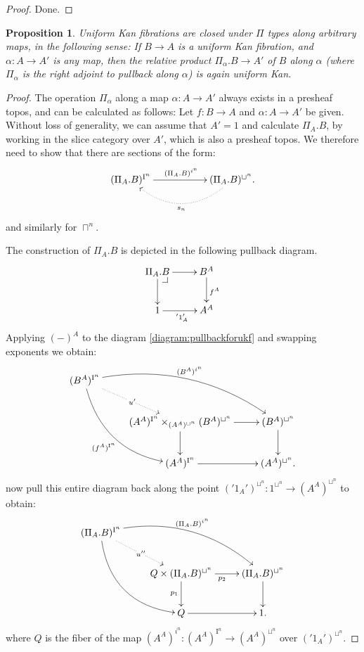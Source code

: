 \documentclass[11pt]{article}
\makeatletter
\newcommand{\pbcorner}[1][dr]{\save*!/#1-1.2pc/#1:(-1,1)@^{|-}\restore}
\newcommand{\I}{\ensuremath{\mathrm{I}}}
\newtheorem{proposition}[theorem]{Proposition}
\theoremstyle{remark}
\theoremstyle{definition}
\makeatother
\begin{document}
\begin{proof}
Done.
\end{proof}

\begin{proposition}
Uniform Kan fibrations are closed under $\Pi$ types along arbitrary maps, in the following sense:
If $B\to A$ is a uniform Kan fibration, and $\alpha: A\to A'$ is any map, then the relative product $\Pi_\alpha.B\to A'$ of $B$ along $\alpha$ (where $\Pi_\alpha$ is the right adjoint to pullback along $\alpha$) is again uniform Kan.
\end{proposition}

\begin{proof}
The operation $\Pi_\alpha$ along a map $\alpha : A\to A'$ always exists in a presheaf topos, and can  be calculated as follows:  Let $f:B\to A$ and $\alpha: A\to A'$ be given.  Without loss of generality, we can assume that $A' =1$ and calculate $\Pi_A.B$, by working in the slice category over $A'$, which is also a presheaf topos.  We therefore need to show that there are sections of the form:
\[
\xymatrix{
(\Pi_A.B)^{\I^n} \ar[rr]^{(\Pi_A.B)^{i^n}} & & \ar@{.>}@/{}^{2pc}/[ll]^{s_n} (\Pi_A.B)^{\sqcup^n}.
}
\]
and similarly for $\sqcap^n$.

The construction of $\Pi_A.B$ is depicted in the following pullback diagram.
\begin{equation}%
\xymatrix{
\Pi_A.B \ar[d] \ar[r] \pbcorner & B^A \ar[d]^{f^A} \\
1 \ar[r]_{^\prime1_A^\prime} & A^A
}
\end{equation}
Applying $(-)^A$ to the diagram \eqref{diagram:pullbackforukf} and swapping exponents we obtain:
\begin{equation}\label{diagram:pullbackforukf2}
\xymatrix{
(B^A)^{\I^n} \ar@/{}_{2pc}/[rdd]_{(f^A)^{\I^n}} \ar@/{}^{2pc}/[rrd]^{(B^A)^{i^n}} \ar@{.>}[rd]|{u'} & & \\
&  (A^A)^{\I^n}\times_{(A^A)^{\sqcup^n}} (B^A)^{\sqcup^n} \ar[d] \ar[r] & (B^A)^{\sqcup^n} \ar[d] \\
& (A^A)^{\I^n} \ar[r] & (A^A)^{\sqcup^n}.
}
\end{equation}
now pull this entire diagram back along the point $('1_A')^{\sqcup^n}
: 1^{\sqcup^n} \to (A^A)^{\sqcup^n}$ to obtain:
\begin{equation}\label{diagram:pullbackforukf3}
\xymatrix{
(\Pi_A.B )^{\I^n} \ar@/{}_{2pc}/[rdd] \ar@/{}^{2pc}/[rrd]^{(\Pi_A.B )^{i^n}} \ar@{.>}[rd]|{u''} & & \\
&  Q \times (\Pi_A.B )^{\sqcup^n} \ar[d]_{p_1} \ar[r]_{p_2} & (\Pi_A.B )^{\sqcup^n} \ar[d] \\
& Q \ar[r] & 1.
}
\end{equation}
where $Q$ is the fiber of the map $(A^A)^{i^n} : (A^A)^{\I^n}\to (A^A)^{\sqcup^n}$ over $('1_A')^{\sqcup^n}$.


\end{proof}
\end{document}
